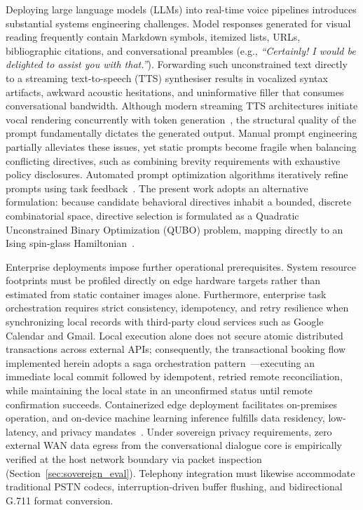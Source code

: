 \documentclass[review,12pt,times,authoryear]{elsarticle}
\theoremstyle{definition}
\begin{document}
Deploying large language models (LLMs) into real-time voice pipelines introduces substantial systems engineering challenges. Model responses generated for visual reading frequently contain Markdown symbols, itemized lists, URLs, bibliographic citations, and conversational preambles (e.g., \textit{``Certainly! I would be delighted to assist you with that.''}). Forwarding such unconstrained text directly to a streaming text-to-speech (TTS) synthesiser results in vocalized syntax artifacts, awkward acoustic hesitations, and uninformative filler that consumes conversational bandwidth. Although modern streaming TTS architectures initiate vocal rendering concurrently with token generation~\citep{Shikhar2025}, the structural quality of the prompt fundamentally dictates the generated output. Manual prompt engineering partially alleviates these issues, yet static prompts become fragile when balancing conflicting directives, such as combining brevity requirements with exhaustive policy disclosures. Automated prompt optimization algorithms iteratively refine prompts using task feedback~\citep{Pryzant2023,Yang2024,Ramnath2025}. The present work adopts an alternative formulation: because candidate behavioral directives inhabit a bounded, discrete combinatorial space, directive selection is formulated as a Quadratic Unconstrained Binary Optimization (QUBO) problem, mapping directly to an Ising spin-glass Hamiltonian~\citep{Lucas2014,Glover2019}.

Enterprise deployments impose further operational prerequisites. System resource footprints must be profiled directly on edge hardware targets rather than estimated from static container images alone. Furthermore, enterprise task orchestration requires strict consistency, idempotency, and retry resilience when synchronizing local records with third-party cloud services such as Google Calendar and Gmail. Local execution alone does not secure atomic distributed transactions across external APIs; consequently, the transactional booking flow implemented herein adopts a saga orchestration pattern~\citep{GarciaMolina1987}—executing an immediate local commit followed by idempotent, retried remote reconciliation, while maintaining the local state in an unconfirmed status until remote confirmation succeeds. Containerized edge deployment facilitates on-premises operation, and on-device machine learning inference fulfills data residency, low-latency, and privacy mandates~\citep{Wang2025edge}. Under sovereign privacy requirements, zero external WAN data egress from the conversational dialogue core is empirically verified at the host network boundary via packet inspection (Section~\ref{sec:sovereign_eval}). Telephony integration must likewise accommodate traditional PSTN codecs, interruption-driven buffer flushing, and bidirectional G.711 format conversion.
\end{document}
